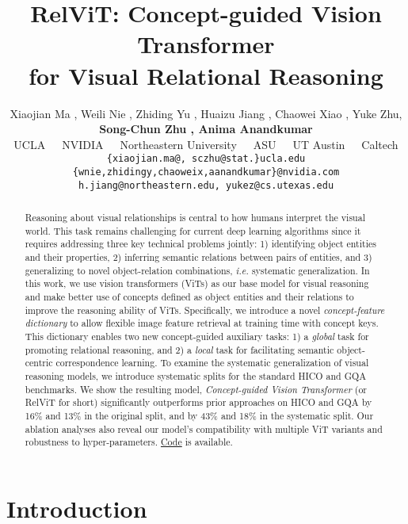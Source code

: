 \documentclass{article} \usepackage{iclr2022_conference,times}
\title{RelViT: Concept-guided Vision Transformer\\
for Visual Relational Reasoning}
\author{Xiaojian Ma , Weili Nie , Zhiding Yu , Huaizu Jiang , Chaowei Xiao , Yuke Zhu, \\ \textbf{Song-Chun Zhu , Anima Anandkumar}  \\
UCLA~~~NVIDIA~~~Northeastern University~~~ASU~~~UT Austin~~~Caltech \\
\texttt{\small{\{xiaojian.ma@, sczhu@stat.\}ucla.edu}} \\
\texttt{\small{\{wnie,zhidingy,chaoweix,aanandkumar\}@nvidia.com}}\\
\texttt{\small{h.jiang@northeastern.edu, yukez@cs.utexas.edu}}
}
\begin{document}
\maketitle

\begin{abstract}
Reasoning about visual relationships is central to how humans interpret the visual world. This task remains challenging for current deep learning algorithms since it requires addressing three key technical problems jointly: 1) identifying object entities and their properties, 2) inferring semantic relations between pairs of entities, and 3) generalizing to novel object-relation combinations, \emph{i.e.} systematic generalization. In this work, we use vision transformers (ViTs) as our base model for visual reasoning and make better use of concepts defined as object entities and their relations to improve the reasoning ability of ViTs.
Specifically, we introduce a novel \textit{concept-feature dictionary} to allow flexible image feature retrieval at training time with concept keys. This dictionary enables two new concept-guided auxiliary tasks: 1) a \textit{global} task for promoting relational reasoning, and 2) a \textit{local} task for facilitating semantic object-centric correspondence learning. 
To examine the systematic generalization of visual reasoning models, we introduce systematic splits for the standard HICO and GQA benchmarks. We show the resulting model, \emph{Concept-guided Vision Transformer} (or RelViT for short) significantly outperforms prior approaches on HICO and GQA by 16\% and 13\% in the original split, and by 43\% and 18\% in the systematic split. Our ablation analyses also reveal our model's compatibility with multiple ViT variants and robustness to hyper-parameters. \textcolor{blue}{\href{https://github.com/NVlabs/RelViT}{Code}} is available.
\end{abstract}


\vspace{-6pt}
\section{Introduction}
\vspace{-3pt}
\label{sec:intro}
\end{document}
